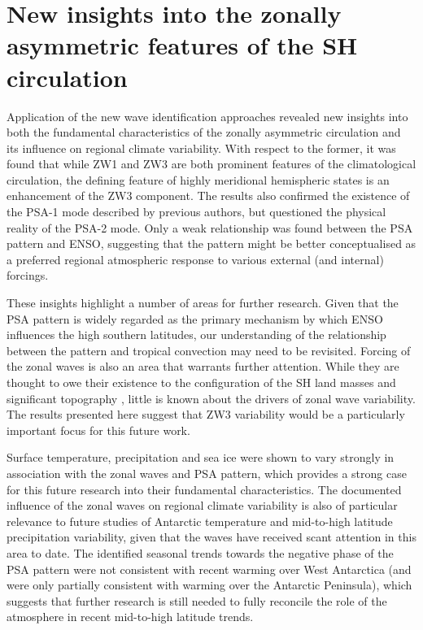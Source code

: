 

\section{New insights into the zonally asymmetric features of the SH circulation}

Application of the new wave identification approaches revealed new insights into both the fundamental characteristics of the zonally asymmetric circulation and its influence on regional climate variability. With respect to the former, it was found that while ZW1 and ZW3 are both prominent features of the climatological circulation, the defining feature of highly meridional hemispheric states is an enhancement of the ZW3 component. The results also confirmed the existence of the PSA-1 mode described by previous authors, but questioned the physical reality of the PSA-2 mode. Only a weak relationship was found between the PSA pattern and ENSO, suggesting that the pattern might be better conceptualised as a preferred regional atmospheric response to various external (and internal) forcings. 

These insights highlight a number of areas for further research. Given that the PSA pattern is widely regarded as the primary mechanism by which ENSO influences the high southern latitudes, our understanding of the relationship between the pattern and tropical convection may need to be revisited. Forcing of the zonal waves is also an area that warrants further attention. While they are thought to owe their existence to the configuration of the SH land masses and significant topography \citep{Baines1989}, little is known about the drivers of zonal wave variability. The results presented here suggest that ZW3 variability would be a particularly important focus for this future work.  

Surface temperature, precipitation and sea ice were shown to vary strongly in association with the zonal waves and PSA pattern, which provides a strong case for this future research into their fundamental characteristics. The documented influence of the zonal waves on regional climate variability is also of particular relevance to future studies of Antarctic temperature and mid-to-high latitude precipitation variability, given that the waves have received scant attention in this area to date. The identified seasonal trends towards the negative phase of the PSA pattern were not consistent with recent warming over West Antarctica (and were only partially consistent with warming over the Antarctic Peninsula), which suggests that further research is still needed to fully reconcile the role of the atmosphere in recent mid-to-high latitude trends. 


